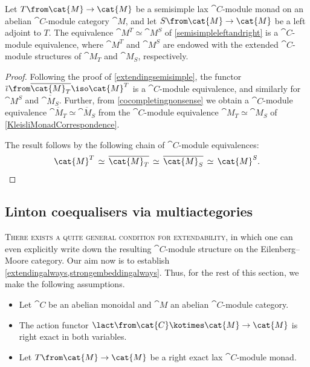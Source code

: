 \begin{proposition}\label{ModuleEMSemisimple}
  Let \(T\from \cat{M} \to \cat{M}\) be a semisimple lax \(\cat{C}\)\hyp{}module monad on an abelian \(\cat{C}\)\hyp{}module category \(\cat{M}\),
  and let \(S\from \cat{M} \to \cat{M}\) be a left adjoint to \(T\).
  The equivalence \(\cat{M}^T \simeq \cat{M}^S\) of \cref{semisimpleleftandright} is a \(\cat{C}\)\hyp{}module equivalence,
  where \(\cat{M}^T\) and \(\cat{M}^{S}\) are endowed with the extended \(\cat{C}\)\hyp{}module structures
  of \(\cat{M}_T\) and \(\cat{M}_{S}\), respectively.
\end{proposition}
\begin{proof}
  Following the proof of \cref{extendingsemisimple},
  the functor \(\overline{\iota}\from \overline{\cat{M}_T} \iso \cat{M}^T\) is a \(\cat{C}\)\hyp{}module equivalence,
  and similarly for \(\cat{M}^{S}\) and \(\overline{\cat{M}_{S}}\).
  Further, from \cref{cocompletingnonsense} we obtain a \(\cat{C}\)\hyp{}module equivalence
  \(\overline{\cat{M}_T} \simeq \overline{\cat{M}_{S}}\)
  from the \(\cat{C}\)\hyp{}module equivalence \(\cat{M}_{T} \simeq \cat{M}_{S}\) of \cref{KleisliMonadCorrespondence}.

  The result follows by the following chain of \(\cat{C}\)\hyp{}module equivalences:
  \[
    \cat{M}^T \,\simeq\, \overline{\cat{M}_T} \,\simeq\, \overline{\cat{M}_{S}} \,\simeq\, \cat{M}^{S}.\qedhere
  \]
\end{proof}

\subsection{Linton coequalisers via multiactegories}\label{extendingeverything}

\textsc{There exists a quite general condition for extendability},
in which one can even explicitly write down the resulting \(\cat{C}\)\hyp{}module structure on the Eilenberg–Moore category.
Our aim now is to establish \cref{extendingalways,strongembeddingalways}.
Thus, for the rest of this section, we make the following assumptions.

\begin{hypothesis}\hfill
  \begin{itemize}[noitemsep]
    \item Let \(\cat{C}\) be an abelian monoidal and \(\cat{M}\) an abelian \(\cat{C}\)\hyp{}module category.
    \item The action functor \(\lact \from \cat{C} \kotimes \cat{M} \to \cat{M}\) is right exact in both variables.
    \item Let \(T\from \cat{M}\to \cat{M}\) be a right exact lax \(\cat{C}\)\hyp{}module monad.
  \end{itemize}
\end{hypothesis}

